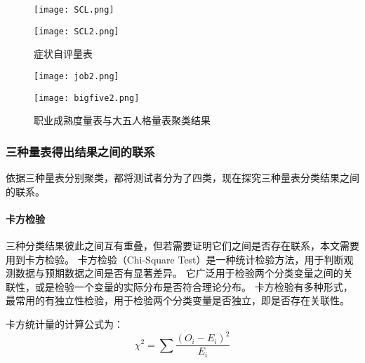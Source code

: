 \documentclass[withoutpreface,bwprint]{cumcmthesis} %
\begin{document}
\begin{figure}
    \centering
    \begin{minipage}[c]{0.48\textwidth}
        \centering
        \texttt{[image: SCL.png]}
    \end{minipage}
    \begin{minipage}[c]{0.48\textwidth}
        \centering
        \texttt{[image: SCL2.png]}
    \end{minipage}
    \caption{症状自评量表}
\end{figure}


\begin{figure}
    \centering
    \begin{minipage}[c]{0.48\textwidth}
        \centering
        \texttt{[image: job2.png]}
    \end{minipage}
    \begin{minipage}[c]{0.48\textwidth}
        \centering
        \texttt{[image: bigfive2.png]}
    \end{minipage}
    \caption{职业成熟度量表与大五人格量表聚类结果}
\end{figure}


\subsubsection{三种量表得出结果之间的联系}

依据三种量表分别聚类，都将测试者分为了四类，现在探究三种量表分类结果之间的联系。

\paragraph*{卡方检验}三种分类结果彼此之间互有重叠，但若需要证明它们之间是否存在联系，本文需要用到卡方检验。
卡方检验（Chi-Square Test）\cite{Chi-Square Test}是一种统计检验方法，用于判断观测数据与预期数据之间是否有显著差异。
它广泛用于检验两个分类变量之间的关联性，或是检验一个变量的实际分布是否符合理论分布。
卡方检验有多种形式，最常用的有独立性检验，用于检验两个分类变量是否独立，即是否存在关联性。


卡方统计量的计算公式为：
\begin{equation}
    \chi^2 = \sum \frac{(O_i - E_i)^2}{E_i}
    \label{eq:Chi-Square}
\end{equation}
\end{document}
